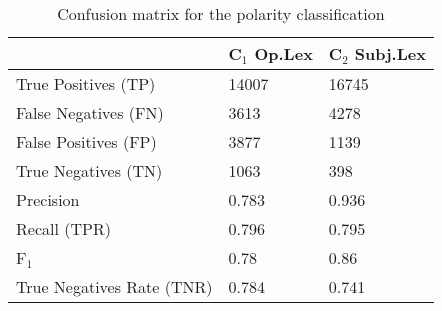 \documentclass[
	a4paper,
	pdftex,
	12pt,	
	footinclude=true,
	fleqn,
	final,
	]{report}%
\begin{document}
\begin{table}[h]
\centering
\begin{tabular}{m{5cm}m{3cm}m{3cm}}
\toprule
                          & C$_{1}$ Op.Lex  & C$_{2}$ Subj.Lex \\ \toprule
True Positives (TP)       & 14007              & 16745                 \\
False Negatives (FN)     & 3613               & 4278                  \\
False Positives (FP)      & 3877               & 1139                  \\
True Negatives (TN)       & 1063               & 398                   \\
Precision                 & 0.783              & 0.936                 \\
Recall (TPR)              & 0.796              & 0.795                 \\
F$_{1}$                        & 0.78               & 0.86                  \\
True Negatives Rate (TNR) & 0.784              & 0.741                 \\ \bottomrule
\end{tabular}%
\caption[Confusion matrix for the polarity classification]{\small \centering Confusion matrix for the polarity classification}
\label{t:eval}
\end{table}
\end{document}
